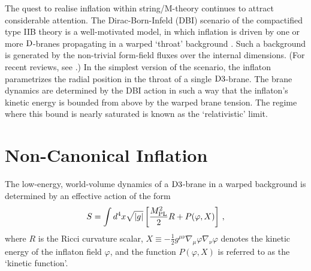 The quest to realise inflation within string/M-theory continues to 
attract considerable attention. The Dirac-Born-Infeld (DBI) scenario 
of the compactified type IIB theory is a well-motivated model, 
in which inflation is driven by one or more ${\rm D}$-branes 
propagating in a warped `throat' background
\cite{brane1,brane11,brane12,brane13, brane2,brane20,brane3, brane4,brane5,brane6}
. Such a background is generated 
by the non-trivial form-field fluxes over the internal dimensions. 
(For recent reviews, see
\cite{tyereview,McAllister:2007bg,Lorenz:2007ze,Kallosh:2007wm,Bean:2007eh,bean,
cline}.) 
In the simplest version of the scenario, 
the inflaton parametrizes the radial 
position in the throat of a single ${\rm D3}$-brane. 
The brane dynamics are determined by the DBI action in such a 
way that the inflaton's kinetic energy is bounded from above by the warped 
brane tension. The regime where this bound is nearly saturated is 
known as the `relativistic' limit.


\section{Non-Canonical Inflation} 
\label{sec:noncanoninfl}


The low-energy, world-volume dynamics of a 
${\rm D3}$-brane in a warped background is determined 
by an effective action of the form 
% 
\begin{equation}
\label{eq:DBIaction-dbiintro2}
S=\int  d^4x \sqrt{|g|} \left[ \frac{M_{\mathrm{PL}}^2}{2} R 
+ P (\varphi , X) \right] \,,
\end{equation}
% 
where $R$ is the Ricci curvature scalar, 
$X \equiv -\frac{1}{2}g^{\mu \nu}\nabla_\mu \varphi \nabla_\nu \varphi$
denotes the kinetic energy of the inflaton field $\varphi$, and the function  
$P (\varphi , X)$ is referred to as the `kinetic function'.  


